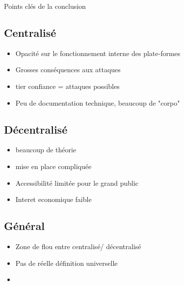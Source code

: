 Points clés de la conclusion 
\subsection{Centralisé} 
\begin{itemize}
    \item Opacité sur le fonctionnement interne des plate-formes
    \item Grosses conséquences aux attaques
    \item tier confiance = attaques possibles
    \item Peu de documentation technique, beaucoup de "corpo"
\end{itemize}

\subsection{Décentralisé}
\begin{itemize}
    \item beaucoup de théorie
    \item mise en place compliquée
    \item Accessibilité limitée pour le grand public
    \item Interet economique faible
\end{itemize}

\subsection{Général}
\begin{itemize}
    \item Zone de flou entre centralisé/ décentralisé
    \item Pas de réelle définition universelle
    \item 
\end{itemize}